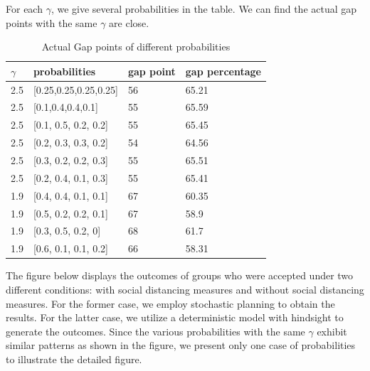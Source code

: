 For each $\gamma$, we give several probabilities in the table. We can find the actual gap points with the same $\gamma$ are close.

\begin{table}[ht]
  \centering
  \caption{Actual Gap points of different probabilities}
  \begin{tabular}{|l|l|l|l|}
  \hline
  $\gamma$  & probabilities & gap point & gap percentage \\
  \hline
  2.5  & [0.25,0.25,0.25,0.25] & 56 & 65.21 \\
  2.5  & [0.1,0.4,0.4,0.1] & 55 & 65.59 \\
  2.5  & [0.1, 0.5, 0.2, 0.2] & 55 & 65.45 \\
  2.5  & [0.2, 0.3, 0.3, 0.2] & 54 & 64.56 \\
  2.5  & [0.3, 0.2, 0.2, 0.3] & 55 & 65.51\\
  2.5  & [0.2, 0.4, 0.1, 0.3] & 55 & 65.41 \\
  1.9  & [0.4, 0.4, 0.1, 0.1] & 67 & 60.35 \\
  1.9  & [0.5, 0.2, 0.2, 0.1] & 67 & 58.9  \\
  1.9  & [0.3, 0.5, 0.2, 0]  &  68 & 61.7  \\
  1.9  & [0.6, 0.1, 0.1, 0.2] & 66 & 58.31 \\
  \hline
  \end{tabular}
\end{table}


The figure below displays the outcomes of groups who were accepted under two different conditions: with social distancing measures and without social distancing measures. For the former case, we employ stochastic planning to obtain the results. For the latter case, we utilize a deterministic model with hindsight to generate the outcomes. Since the various probabilities with the same $\gamma$ exhibit similar patterns as shown in the figure, we present only one case of probabilities to illustrate the detailed figure.

